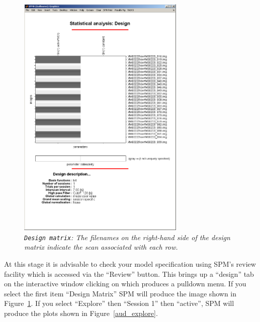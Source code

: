\begin{figure}
\begin{center}
\includegraphics[width=80mm]{auditory/design}
\caption{\emph{\texttt{Design matrix}: The filenames on the right-hand side of the design matrix indicate the scan associated with each row.\label{aud_design}}}
\end{center}
\end{figure}

At this stage it is advisable to check your model specification using SPM's review facility which is accessed via the ``Review'' button. This brings up a ``design'' tab on the interactive window clicking on which produces a pulldown menu. If you select the first item ``Design Matrix'' SPM will produce the image shown in Figure~\ref{aud_design}. If you select ``Explore'' then ``Session 1'' then ``active'', SPM will produce the plots shown in Figure~\ref{aud_explore}.

